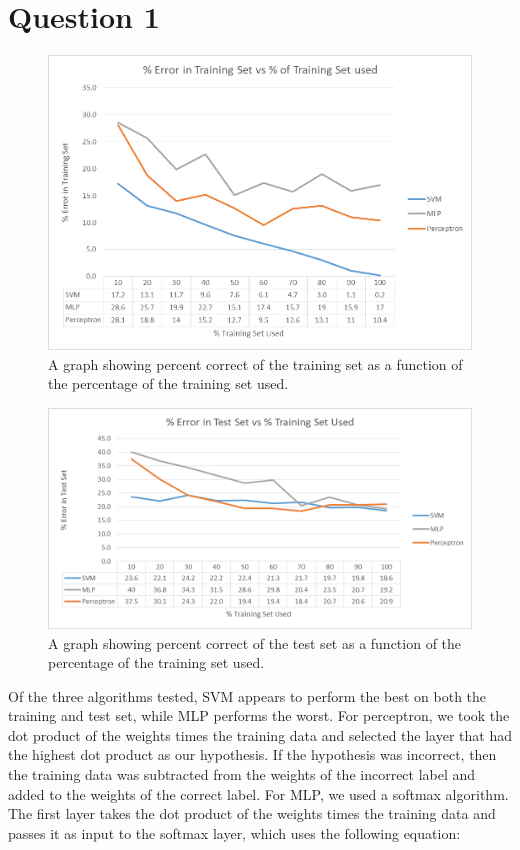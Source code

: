 \documentclass[12pt]{article}
\begin{document}
\section*{Question 1}

\begin{figure}[H]
    \centering
    \includegraphics[width=1\textwidth]{question_1_3}
    \caption{A graph showing percent correct of the training set as a function of the percentage of the training set used.}
    \label{fig:question_1_3}
\end{figure}

\begin{figure}[H]
    \centering
    \includegraphics[width=1\textwidth]{question_1_4}
    \caption{A graph showing percent correct of the test set as a function of the percentage of the training set used.}
    \label{fig:question_1_4}
\end{figure}

Of the three algorithms tested, SVM appears to perform the best on both the training and test set, while MLP performs the worst. For perceptron, we took the dot product of the weights times the training data and selected the layer that had the highest dot product as our hypothesis. If the hypothesis was incorrect, then the training data was subtracted from the weights of the incorrect label and added to the weights of the correct label. For MLP, we used a softmax algorithm. The first layer takes the dot product of the weights times the training data and passes it as input to the softmax layer, which uses the following equation:
\end{document}
